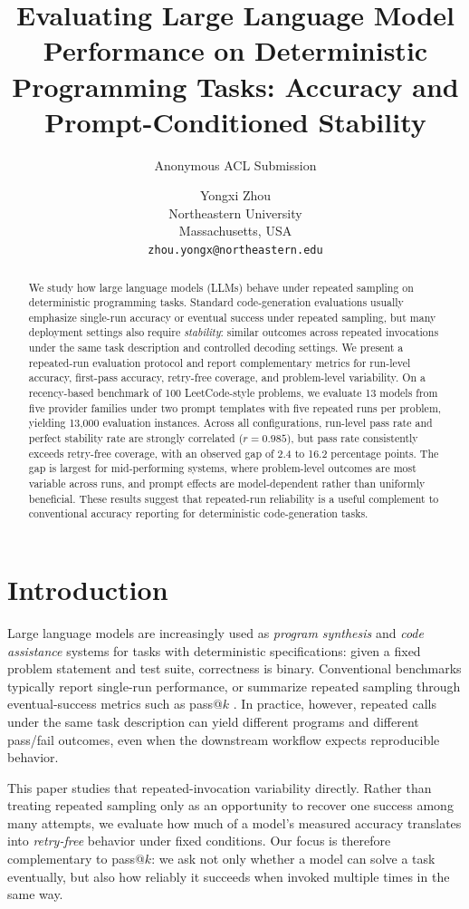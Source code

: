 \documentclass[11pt]{article}
\title{Evaluating Large Language Model Performance on Deterministic Programming Tasks: Accuracy and Prompt-Conditioned Stability}
\author{Anonymous ACL Submission}
\author{
  Yongxi Zhou \\
  Northeastern University \\
  Massachusetts, USA \\
  \texttt{zhou.yongx@northeastern.edu}
}
\begin{document}
\maketitle

\begin{abstract}
We study how large language models (LLMs) behave under repeated sampling on deterministic programming tasks. Standard code-generation evaluations usually emphasize single-run accuracy or eventual success under repeated sampling, but many deployment settings also require \emph{stability}: similar outcomes across repeated invocations under the same task description and controlled decoding settings. We present a repeated-run evaluation protocol and report complementary metrics for run-level accuracy, first-pass accuracy, retry-free coverage, and problem-level variability. On a recency-based benchmark of 100 LeetCode-style problems, we evaluate 13 models from five provider families under two prompt templates with five repeated runs per problem, yielding 13{,}000 evaluation instances. Across all configurations, run-level pass rate and perfect stability rate are strongly correlated ($r=0.985$), but pass rate consistently exceeds retry-free coverage, with an observed gap of 2.4 to 16.2 percentage points. The gap is largest for mid-performing systems, where problem-level outcomes are most variable across runs, and prompt effects are model-dependent rather than uniformly beneficial. These results suggest that repeated-run reliability is a useful complement to conventional accuracy reporting for deterministic code-generation tasks.
\end{abstract}

\section{Introduction}
Large language models are increasingly used as \emph{program synthesis} and \emph{code assistance} systems for tasks with deterministic specifications: given a fixed problem statement and test suite, correctness is binary. Conventional benchmarks typically report single-run performance, or summarize repeated sampling through eventual-success metrics such as pass@$k$ \cite{chen2021codex,austin2021program}. In practice, however, repeated calls under the same task description can yield different programs and different pass/fail outcomes, even when the downstream workflow expects reproducible behavior.

This paper studies that repeated-invocation variability directly. Rather than treating repeated sampling only as an opportunity to recover one success among many attempts, we evaluate how much of a model's measured accuracy translates into \emph{retry-free} behavior under fixed conditions. Our focus is therefore complementary to pass@$k$: we ask not only whether a model can solve a task eventually, but also how reliably it succeeds when invoked multiple times in the same way.
\end{document}
